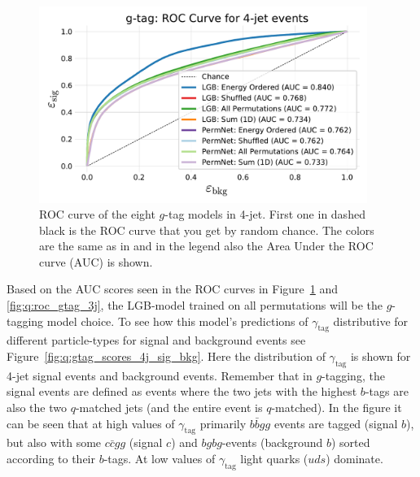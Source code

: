\begin{figure}[h!]
  \centerfloat
  \includegraphics[width=0.95\textwidth, trim=10 10 10 40, clip]{figures/quarks/gtag_ROC_4_jet-down_sample=1.00-ML_vars=vertex-selection=b-ejet_min=4-n_iter_RS_lgb=99-n_iter_RS_xgb=9-cdot_cut=0.90-version=19.pdf}
  \caption[ROC Curve for $g$-Tag in 4-Jet Events]
          {ROC curve of the eight $g$-tag models in 4-jet. First one in dashed black is the ROC curve that you get by random chance. The colors are the same as in  and in the legend also the Area Under the ROC curve (AUC) is shown.} 
  \label{fig:q:roc_gtag_4j}
\end{figure}

Based on the AUC scores seen in the ROC curves in Figure~\ref{fig:q:roc_gtag_4j} and \ref{fig:q:roc_gtag_3j}, the LGB-model trained on all permutations will be the $g$-tagging model choice. To see how this model's predictions of $\gamma_\mathrm{tag}$ distributive for different particle-types for signal and background events see Figure~\ref{fig:q:gtag_scores_4j_sig_bkg}. Here the distribution of $\gamma_\mathrm{tag}$ is shown for 4-jet signal events and background events. Remember that in $g$-tagging, the signal events are defined as events where the two jets with the highest $b$-tags are also the two $q$-matched jets (and the entire event is $q$-matched). In the figure it can be seen that at high values of $\gamma_\mathrm{tag}$ primarily $b\bar{b}gg$ events are tagged (signal $b$), but also with some $c\bar{c}gg$ (signal $c$) and $bgbg$-events (background $b$) sorted according to their $b$-tags. At low values of $\gamma_\mathrm{tag}$ light quarks ($uds$) dominate. 

